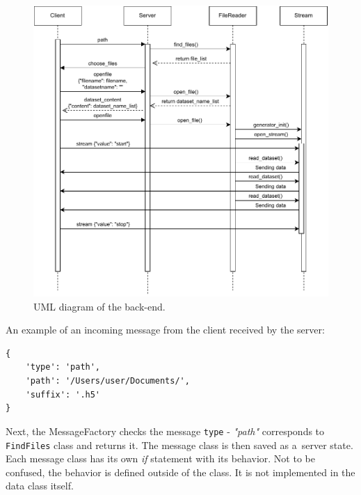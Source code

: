 \begin{figure}
    \centering
    \includegraphics[width=\linewidth]{pdf/websocketcomm.drawio.pdf}
    \caption{UML diagram of the back-end.}
    \label{fig:websocket_comm}
\end{figure}

An example of an incoming message from the client received by the server:
\begin{verbatim}
{
    'type': 'path',
    'path': '/Users/user/Documents/',
    'suffix': '.h5'
}
\end{verbatim}

Next, the MessageFactory checks the message \verb|type| - \textit{"path"} corresponds to \texttt{FindFiles} class and returns it. The message class is then saved as a~server state. Each message class has its own \textit{if} statement with its behavior. Not to be confused, the behavior is defined outside of the class. It is not implemented in the data class itself.

